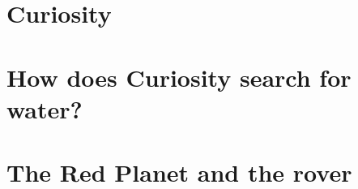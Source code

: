 \documentclass[DIV=calc, paper=a4, fontsize=12pt]{scrartcl}	 %
\begin{document}



\section{Curiosity}

\begin{multicols}{2}



\end{multicols}



\pagebreak

\section{How does Curiosity search for water?}

\begin{multicols}{2}













\end{multicols}

\noindent\makebox[\linewidth]{\rule{\textwidth}{0.4pt}}

\section{The Red Planet and the rover}

\begin{multicols}{2}



\end{multicols}
\end{document}
